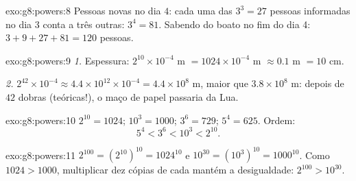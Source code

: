 \begin{solution}{exo:g8:powers:8}
Pessoas novas no dia $4$: cada uma das $3^3 = 27$ pessoas informadas no
dia 3 conta a três outras: $3^4 = 81$. Sabendo do boato no fim do dia
4: $3 + 9 + 27 + 81 = 120$ pessoas.
\end{solution}

\begin{solution}{exo:g8:powers:9}
\emph{1.} Espessura: $2^{10} \times 10^{-4}$ m
$= 1024 \times 10^{-4}$ m $\approx 0.1$ m $= 10$ cm.

\emph{2.} $2^{42} \times 10^{-4} \approx 4.4 \times 10^{12} \times
10^{-4} = 4.4 \times 10^8$ m, maior que $3.8 \times 10^8$ m: depois de
$42$ dobras (teóricas!), o maço de papel passaria da Lua.
\end{solution}

\begin{solution}{exo:g8:powers:10}
$2^{10} = 1024$; $10^3 = 1000$; $3^6 = 729$; $5^4 = 625$. Ordem:
\[
5^4 < 3^6 < 10^3 < 2^{10} .
\]
\end{solution}

\begin{solution}{exo:g8:powers:11}
$2^{100} = \left(2^{10}\right)^{10} = 1024^{10}$ e
$10^{30} = \left(10^3\right)^{10} = 1000^{10}$. Como $1024 > 1000$,
multiplicar dez cópias de cada mantém a desigualdade:
$2^{100} > 10^{30}$.
\end{solution}

